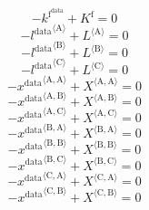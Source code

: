 \begin{equation}
-k^{\mathrm{f}^{\mathrm{data}}} + K^{\mathrm{f}} = 0
\end{equation}
\begin{equation}
-{l^{\mathrm{data}}}^{\langle \mathrm{\mathrm{A}}\rangle} + {L}^{\langle \mathrm{A}\rangle} = 0
\end{equation}
\begin{equation}
-{l^{\mathrm{data}}}^{\langle \mathrm{\mathrm{B}}\rangle} + {L}^{\langle \mathrm{B}\rangle} = 0
\end{equation}
\begin{equation}
-{l^{\mathrm{data}}}^{\langle \mathrm{\mathrm{C}}\rangle} + {L}^{\langle \mathrm{C}\rangle} = 0
\end{equation}
\begin{equation}
-{x^{\mathrm{data}}}^{\langle \mathrm{\mathrm{A}},\mathrm{\mathrm{A}}\rangle} + {X}^{\langle \mathrm{A},\mathrm{A}\rangle} = 0
\end{equation}
\begin{equation}
-{x^{\mathrm{data}}}^{\langle \mathrm{\mathrm{A}},\mathrm{\mathrm{B}}\rangle} + {X}^{\langle \mathrm{A},\mathrm{B}\rangle} = 0
\end{equation}
\begin{equation}
-{x^{\mathrm{data}}}^{\langle \mathrm{\mathrm{A}},\mathrm{\mathrm{C}}\rangle} + {X}^{\langle \mathrm{A},\mathrm{C}\rangle} = 0
\end{equation}
\begin{equation}
-{x^{\mathrm{data}}}^{\langle \mathrm{\mathrm{B}},\mathrm{\mathrm{A}}\rangle} + {X}^{\langle \mathrm{B},\mathrm{A}\rangle} = 0
\end{equation}
\begin{equation}
-{x^{\mathrm{data}}}^{\langle \mathrm{\mathrm{B}},\mathrm{\mathrm{B}}\rangle} + {X}^{\langle \mathrm{B},\mathrm{B}\rangle} = 0
\end{equation}
\begin{equation}
-{x^{\mathrm{data}}}^{\langle \mathrm{\mathrm{B}},\mathrm{\mathrm{C}}\rangle} + {X}^{\langle \mathrm{B},\mathrm{C}\rangle} = 0
\end{equation}
\begin{equation}
-{x^{\mathrm{data}}}^{\langle \mathrm{\mathrm{C}},\mathrm{\mathrm{A}}\rangle} + {X}^{\langle \mathrm{C},\mathrm{A}\rangle} = 0
\end{equation}
\begin{equation}
-{x^{\mathrm{data}}}^{\langle \mathrm{\mathrm{C}},\mathrm{\mathrm{B}}\rangle} + {X}^{\langle \mathrm{C},\mathrm{B}\rangle} = 0
\end{equation}
